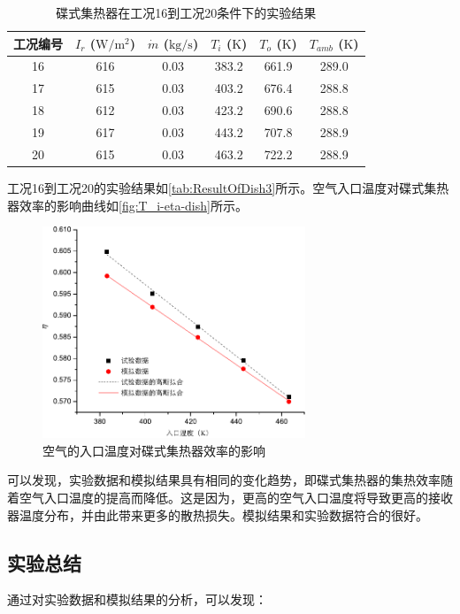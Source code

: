 \begin{table}[htbp]
	\caption{碟式集热器在工况16到工况20条件下的实验结果}
	\centering
	\begin{tabular}{cccccc}
		\toprule
		工况编号	& $I_r$ ($\mathrm{W/m^2}$)	&	$\dot{m}$ ($\mathrm{kg/s}$)			&	$T_i$ ($\mathrm{K}$)	&	$T_o$ ($\mathrm{K}$)		&	$T_{amb}$ ($\mathrm{K}$)\\
		\midrule
		16	&	616	&	0.03	&	383.2	&	661.9	&	289.0\\
		17	&	615	&	0.03	&	403.2	&	676.4	&	288.8\\
		18	&	612	&	0.03	&	423.2	&	690.6	&	288.8	\\
		19	&	617	&	0.03	&	443.2	&	707.8	&	288.9\\
		20	&	615	&	0.03	&	463.2	&	722.2	&	288.9\\
		\bottomrule
	\end{tabular}
	\label{tab:ResultOfDish3}
\end{table}
工况16到工况20的实验结果如\autoref{tab:ResultOfDish3}所示。空气入口温度对碟式集热器效率的影响曲线如\autoref{fig:T_i-eta-dish}所示。
\begin{figure}[!ht]
\centering
\includegraphics[width=0.7\textwidth]{fig/T_i-eta-dish}
\caption{空气的入口温度对碟式集热器效率的影响}
\label{fig:T_i-eta-dish}
\end{figure}

可以发现，实验数据和模拟结果具有相同的变化趋势，即碟式集热器的集热效率随着空气入口温度的提高而降低。这是因为，更高的空气入口温度将导致更高的接收器温度分布，并由此带来更多的散热损失。模拟结果和实验数据符合的很好。

\subsection{实验总结}
通过对实验数据和模拟结果的分析，可以发现：

